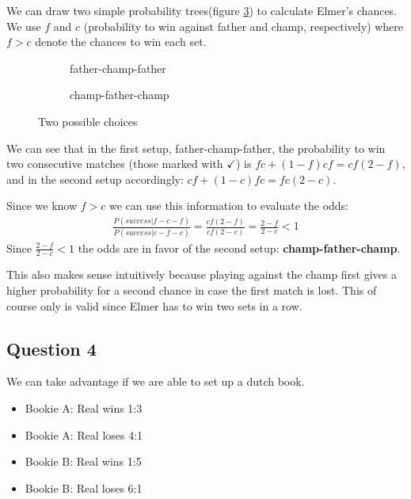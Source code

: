 \documentclass[../main/Notes.tex]{subfiles}
\begin{document}
We can draw two simple probability trees(figure \ref{fig:2014-06-06_mt3trees}) to calculate Elmer's chances. We use $f$ and $c$ (probability to win against father and champ, respectively) where $f > c$ denote the chances to win each set.
\begin{figure}[!ht]
  \centering
  \begin{subfigure}{.45\linewidth}
    \centering
    
    \caption{father-champ-father}
    \label{fig:2014-06-06_mt3tree1}
  \end{subfigure}
  \begin{subfigure}{.45\linewidth}
    \centering
    
    \caption{champ-father-champ}
    \label{fig:2014-06-06_mt3tree2}
  \end{subfigure}
  \caption{Two possible choices}
  \label{fig:2014-06-06_mt3trees}
\end{figure}

We can see that in the first setup, father-champ-father, the probability to win two consecutive matches (those marked with $\checkmark$) is $fc+(1-f)cf=cf(2-f)$, and in the second setup accordingly: $cf+(1-c)fc=fc(2-c)$.

Since we know $f>c$ we can use this information to evaluate the odds:
\begin{align*}
\frac{P(success|f-c-f)}{P(success|c-f-c)} = \frac{cf(2-f)}{cf(2-c)} = \frac{2-f}{2-c} < 1
\end{align*}
Since $\frac{2-f}{2-c} < 1$ the odds are in favor of the second setup: \textbf{champ-father-champ}.

This also makes sense intuitively because playing against the champ first gives a higher probability for a second chance in case the first match is lost. This of course only is valid since Elmer has to win two sets in a row.



\subsection*{Question 4}
We can take advantage if we are able to set up a dutch book.
\begin{itemize}
	\item Bookie A: Real wins 1:3
  \item Bookie A: Real loses 4:1
	\item Bookie B: Real wins 1:5
  \item Bookie B: Real loses 6:1
\end{itemize}
\end{document}
